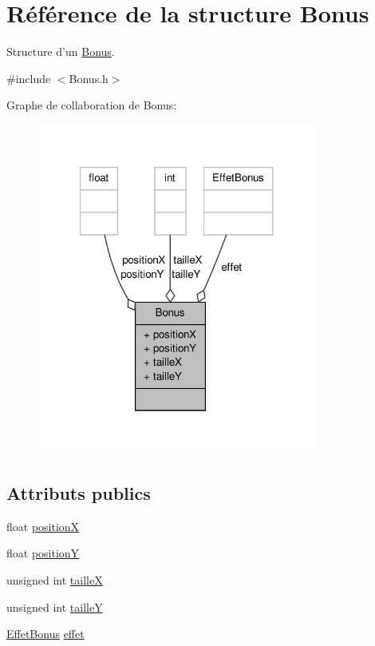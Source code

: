 \hypertarget{structBonus}{\section{Référence de la structure Bonus}
\label{structBonus}
}


Structure d'un \hyperlink{structBonus}{Bonus}.  




{\ttfamily \#include $<$Bonus.\-h$>$}



Graphe de collaboration de Bonus\-:
\nopagebreak
\begin{figure}[H]
\begin{center}
\leavevmode
\includegraphics[width=260pt]{structBonus__coll__graph}
\end{center}
\end{figure}
\subsection*{Attributs publics}
\begin{DoxyCompactItemize}
\item 
float \hyperlink{structBonus_a299226996e549498df83b3768d3b43af}{position\-X}
\item 
float \hyperlink{structBonus_aa5cc7fbc0c3fe6b014900c7223a1d6cb}{position\-Y}
\item 
unsigned int \hyperlink{structBonus_aede925340da983fdddf1f901c976e00a}{taille\-X}
\item 
unsigned int \hyperlink{structBonus_ae570700aa309f6de2f91fc84ddb409c2}{taille\-Y}
\item 
\hyperlink{EffetBonus_8h_a5c3ffd6a343fb8d5f63c87ee1a37a7fe}{Effet\-Bonus} \hyperlink{structBonus_a0619fdbeba9edd702a607887a7f79f62}{effet}
\end{DoxyCompactItemize}



